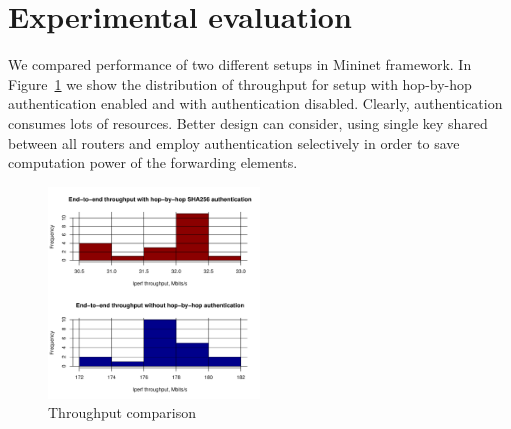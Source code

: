 \section{Experimental evaluation}
\label{section:experiments}

We compared performance of two different setups in Mininet framework. 
In Figure~\ref{fig:tput} we show the distribution of throughput for 
setup with hop-by-hop authentication enabled and with authentication disabled.
Clearly, authentication consumes lots of resources. Better design can consider,
using single key shared between all routers and employ authentication selectively
in order to save computation power of the forwarding elements.

\begin{figure}[!h]
        \includegraphics[width=0.5\textwidth]{graphics/throughput.pdf}
        \caption{Throughput comparison}
        \label{fig:tput}
\end{figure}
